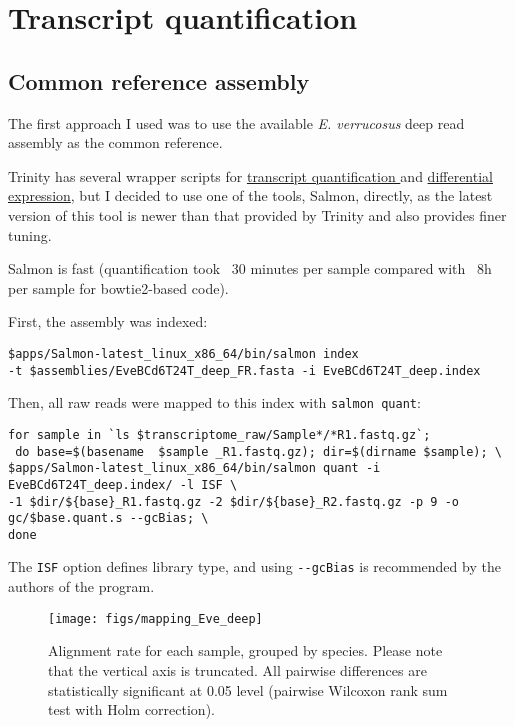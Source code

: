 \documentclass[12pt]{article}
\begin{document}
\section{Transcript quantification}

\subsection{Common reference assembly}

The first approach I used was to use the available \textit{E. verrucosus} deep read assembly as the common reference.

Trinity has several wrapper scripts for \href{https://github.com/trinityrnaseq/trinityrnaseq/wiki/Trinity-Transcript-Quantification}{transcript quantification }and  \href{https://github.com/trinityrnaseq/trinityrnaseq/wiki/Trinity-Differential-Expression}{differential expression}, but I decided to use one of the tools, Salmon, directly, as the latest version of this tool is newer than that provided by Trinity and also provides finer tuning. 

Salmon is fast (quantification took ~30 minutes per sample compared with ~8h per sample for bowtie2-based code).

First, the assembly was indexed:
\begin{verbatim}
$apps/Salmon-latest_linux_x86_64/bin/salmon index 
-t $assemblies/EveBCd6T24T_deep_FR.fasta -i EveBCd6T24T_deep.index
\end{verbatim}

Then, all raw reads were mapped to this index with \verb|salmon quant|: 

\begin{verbatim}
for sample in `ls $transcriptome_raw/Sample*/*R1.fastq.gz`;
 do base=$(basename  $sample _R1.fastq.gz); dir=$(dirname $sample); \
$apps/Salmon-latest_linux_x86_64/bin/salmon quant -i EveBCd6T24T_deep.index/ -l ISF \
-1 $dir/${base}_R1.fastq.gz -2 $dir/${base}_R2.fastq.gz -p 9 -o gc/$base.quant.s --gcBias; \
done 
\end{verbatim}

The \verb|ISF| option defines library type, and using \verb|--gcBias| is  recommended by the authors of the program.

\begin{wrapfigure}[17]{r}{8cm}
\texttt{[image: figs/mapping\_Eve\_deep]}
\caption{Alignment rate for each sample, grouped by species. Please note that the vertical axis is truncated. All pairwise differences are statistically significant at 0.05 level (pairwise Wilcoxon rank sum test with Holm correction).}
\label{mapping_Eve_deep}
\end{wrapfigure}
\end{document}
